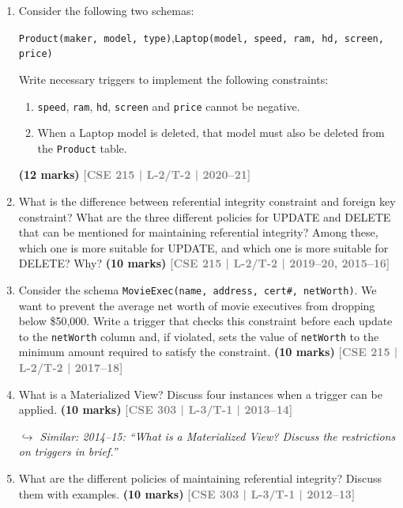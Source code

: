 \documentclass[12pt,a3paper]{article}
\newcommand{\yr}[1]{\hfill\textcolor{gray}{\small\textbf{[#1]}}}
\newcommand{\mk}[1]{\textcolor{orange!70!black}{\small\textbf{(#1 marks)}}}
\newcommand{\variant}[1]{\par\vspace{1pt}\textcolor{blue!50!black}%
  {\footnotesize\textit{$\hookrightarrow$ Similar: #1}}}
\begin{document}
\begin{enumerate}
\item Consider the following two schemas:
\begin{center}
\texttt{Product(maker, model, type)},\quad \texttt{Laptop(model, speed, ram, hd, screen, price)}
\end{center}
Write necessary triggers to implement the following constraints:
\begin{enumerate}
  \item \texttt{speed}, \texttt{ram}, \texttt{hd}, \texttt{screen} and \texttt{price} cannot be negative.
  \item When a Laptop model is deleted, that model must also be deleted from the \texttt{Product} table.
\end{enumerate}
 \mk{12} \yr{CSE 215 | L-2/T-2 | 2020--21}

\item What is the difference between referential integrity constraint and foreign key constraint? What are the three different policies for UPDATE and DELETE that can be mentioned for maintaining referential integrity? Among these, which one is more suitable for UPDATE, and which one is more suitable for DELETE? Why?
\mk{10} \yr{CSE 215 | L-2/T-2 | 2019--20, 2015--16}

\item Consider the schema \texttt{MovieExec(name, address, cert\#, netWorth)}. We want to prevent the average net worth of movie executives from dropping below \$50,000. Write a trigger that checks this constraint before each update to the \texttt{netWorth} column and, if violated, sets the value of \texttt{netWorth} to the minimum amount required to satisfy the constraint.
\mk{10} \yr{CSE 215 | L-2/T-2 | 2017--18}

\item What is a Materialized View? Discuss four instances when a trigger can be applied.
\mk{10} \yr{CSE 303 | L-3/T-1 | 2013--14}

\variant{2014--15: ``What is a Materialized View? Discuss the restrictions on triggers in brief.''}

\item What are the different policies of maintaining referential integrity? Discuss them with examples.
\mk{10} \yr{CSE 303 | L-3/T-1 | 2012--13}


\end{enumerate}
\end{document}
